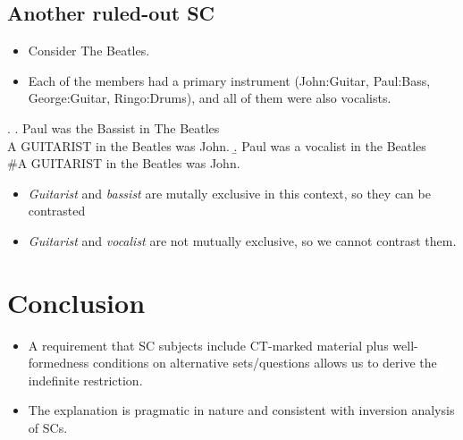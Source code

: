 \documentclass[letterpaper]{article}
\begin{document}
\subsection{Another ruled-out SC}
\begin{itemize}
  \item Consider The Beatles.
  \item Each of the members had a primary instrument (John:Guitar, Paul:Bass, George:Guitar, Ringo:Drums), and all of them were also vocalists.
\end{itemize}
\ex. 
\a. Paul was the Bassist in The Beatles\\
A GUITARIST in the Beatles was John.
\b. Paul was a vocalist in the Beatles\\
\#A GUITARIST in the Beatles was John.

\begin{itemize}
  \item \textit{Guitarist} and \textit{bassist} are mutally exclusive in this context, so they can be contrasted
  \item \textit{Guitarist} and \textit{vocalist} are not mutually exclusive, so we cannot contrast them.
\end{itemize}

\section{Conclusion}
\begin{itemize}
  \item A requirement that SC subjects include CT-marked material plus well-formedness conditions on alternative sets/questions allows us to derive the indefinite restriction.
  \item The explanation is pragmatic in nature and consistent with  inversion analysis of SCs.
\end{itemize}
\printbibliography
\end{document}
